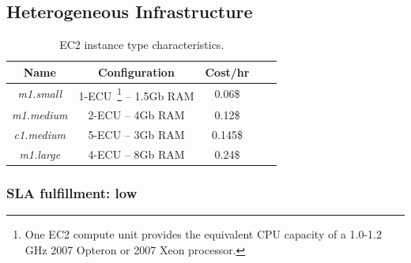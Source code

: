 





\subsection{Heterogeneous Infrastructure}

\begin{table}
  {\scriptsize 
\begin{center}
    \begin{tabular}{  | c | c | c | c | c |}
    \hline
      \textbf{Name}  & \textbf{Configuration} & \textbf{Cost/hr} \\ \hline
   \textit{m1.small}   & 1-ECU~\footnote{One EC2 compute unit provides the equivalent CPU capacity of a 1.0-1.2 GHz 2007 Opteron or 2007 Xeon processor.}  -- 1.5Gb RAM&  0.06\$ \\ \hline
   \textit{m1.medium}   & 2-ECU -- 4Gb RAM&  0.12\$ \\ \hline
\textit{c1.medium} & 5-ECU -- 3Gb RAM& 0.145\$   \\ \hline
\textit{m1.large} & 4-ECU -- 8Gb RAM& 0.24\$   \\ \hline
 \end{tabular}
\end{center}
\vspace{-5mm}
\caption{EC2 instance type characteristics.}
\label{EC2instances}
}
\end{table}

\subsubsection{SLA fulfillment: low}


